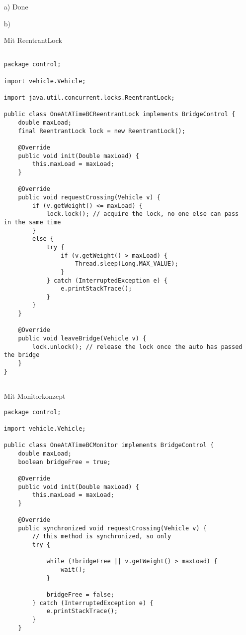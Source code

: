 \begin{itemize}

\item[a)] Done

\item[b)]

Mit ReentrantLock
\begin{lstlisting}[style=java]

package control;

import vehicle.Vehicle;

import java.util.concurrent.locks.ReentrantLock;

public class OneAtATimeBCReentrantLock implements BridgeControl {
    double maxLoad;
    final ReentrantLock lock = new ReentrantLock();

    @Override
    public void init(Double maxLoad) {
        this.maxLoad = maxLoad;
    }

    @Override
    public void requestCrossing(Vehicle v) {
        if (v.getWeight() <= maxLoad) {
            lock.lock(); // acquire the lock, no one else can pass in the same time
        }
        else {
            try {
                if (v.getWeight() > maxLoad) {
                    Thread.sleep(Long.MAX_VALUE);
                }
            } catch (InterruptedException e) {
                e.printStackTrace();
            }
        }
    }

    @Override
    public void leaveBridge(Vehicle v) {
        lock.unlock(); // release the lock once the auto has passed the bridge
    }
}


\end{lstlisting}

Mit Monitorkonzept
\begin{lstlisting}[style=java]
package control;

import vehicle.Vehicle;

public class OneAtATimeBCMonitor implements BridgeControl {
    double maxLoad;
    boolean bridgeFree = true;

    @Override
    public void init(Double maxLoad) {
        this.maxLoad = maxLoad;
    }

    @Override
    public synchronized void requestCrossing(Vehicle v) {
        // this method is synchronized, so only
        try {

            while (!bridgeFree || v.getWeight() > maxLoad) {
                wait();
            }

            bridgeFree = false;
        } catch (InterruptedException e) {
            e.printStackTrace();
        }
    }


\end{lstlisting}
\end{itemize}
